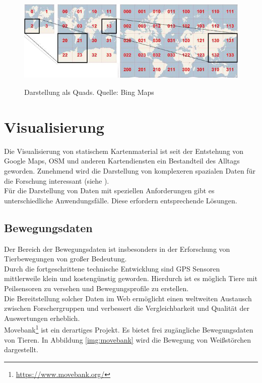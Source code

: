 \documentclass[10pt,conference,compsocconf]{IEEEtran}
\begin{document}
\begin{figure}[H]
  \centering
  	\includegraphics[width=\columnwidth]{img/bing_quads}\\
  \caption[]{Darstellung als Quads. Quelle: Bing Maps\cite{waldbiomasse}}
  \label{img:bing_quads}
\end{figure}


\section{Visualisierung}
Die Visualisierung von statischem Kartenmaterial ist seit der Entstehung von Google Maps, OSM und anderen Kartendiensten ein Bestandteil des Alltags geworden. Zunehmend wird die Darstellung von komplexeren spazialen Daten für die Forschung interessant (siehe \cite{gps_collars} \cite{wms_flow_mapping}).\\
Für die Darstellung von Daten mit speziellen Anforderungen gibt es unterschiedliche Anwendungsfälle. Diese erfordern entsprechende Lösungen.

\subsection{Bewegungsdaten}
Der Bereich der Bewegungsdaten ist insbesonders in der Erforschung von Tierbewegungen von großer Bedeutung\cite{gps_collars}.\\
Durch die fortgeschrittene technische Entwicklung sind GPS Sensoren mittlerweile klein und kostengünstig geworden. Hierdurch ist es möglich Tiere mit Peilsensoren zu versehen und Bewegungsprofile zu erstellen.\\
Die Bereitstellung solcher Daten im Web ermöglicht einen weltweiten Austausch zwischen Forschergruppen und verbessert die Vergleichbarkeit und Qualität der Auswertungen erheblich.\\
Movebank\footnote{\url{https://www.movebank.org/}} ist ein derartiges Projekt. Es bietet frei zugängliche Bewegungsdaten von Tieren. In Abbildung \ref{img:movebank} wird die Bewegung von Weißstörchen dargestellt.
\end{document}
